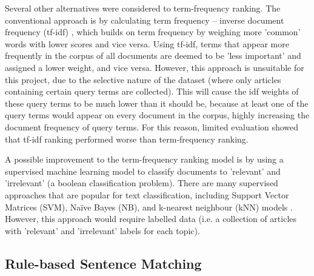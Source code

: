 \documentclass{report}
\begin{document}
Several other alternatives were considered to term-frequency ranking.
The conventional approach is by calculating term frequency -- inverse document frequency (tf-idf) \cite{robertson2004understanding, sparck1972statistical}, which builds on term frequency by weighing more 'common' words with lower scores and vice versa.
Using tf-idf, terms that appear more frequently in the corpus of all documents are deemed to be 'less important' and assigned a lower weight, and vice versa.
However, this approach is unsuitable for this project, due to the selective nature of the dataset (where only articles containing certain query terms are collected). 
This will cause the idf weights of these query terms to be much lower than it should be, because at least one of the query terms would appear on every document in the corpus, highly increasing the document frequency of query terms.
For this reason, limited evaluation showed that tf-idf ranking performed worse than term-frequency ranking.

A possible improvement to the term-frequency ranking model is by using a supervised machine learning model to classify documents to 'relevant' and 'irrelevant' (a boolean classification problem).
There are many supervised approaches that are popular for text classification, including Support Vector Matrices (SVM), Na\"{i}ve Bayes (NB), and k-nearest neighbour (kNN) models \cite{khan2010review}.
However, this approach would require labelled data (i.e. a collection of articles with 'relevant' and 'irrelevant' labels for each topic).

\subsection{Rule-based Sentence Matching} \label{des-matching}
\end{document}
